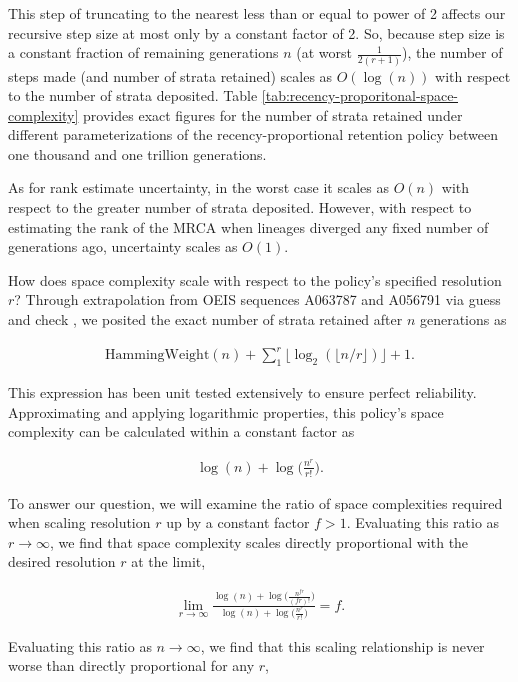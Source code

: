 This step of truncating to the nearest less than or equal to power of 2 affects our recursive step size at most only by a constant factor of 2.
So, because step size is a constant fraction of remaining generations $n$ (at worst $\frac{1}{2(r+1)}$), the number of steps made (and number of strata retained) scales as $O(\log(n))$ with respect to the number of strata deposited.
Table \ref{tab:recency-proporitonal-space-complexity} provides exact figures for the number of strata retained under different parameterizations of the recency-proportional retention policy between one thousand and one trillion generations.

As for rank estimate uncertainty, in the worst case it scales as $O(n)$ with respect to the greater number of strata deposited.
However, with respect to estimating the rank of the MRCA when lineages diverged any fixed number of generations ago, uncertainty scales as $O(1)$.

How does space complexity scale with respect to the policy's specified resolution $r$?
Through extrapolation from OEIS sequences A063787 and A056791 via guess and check \citep{sloane2021a063787,sloane2021a056791}, we posited the exact number of strata retained after $n$ generations as

\begin{align*}
  \mathrm{HammingWeight}(n)
  + \sum_1^r \lfloor \log_2( \lfloor n / r \rfloor ) \rfloor
  + 1.
\end{align*}

This expression has been unit tested extensively to ensure perfect reliability.
Approximating and applying logarithmic properties, this policy's space complexity can be calculated within a constant factor as

\begin{align*}
\log(n) + \log\Big(\frac{n^r}{r!}\Big).
\end{align*}

To answer our question, we will examine the ratio of space complexities required when scaling resolution $r$ up by a constant factor $f > 1$.
Evaluating this ratio as $r \to \infty$, we find that space complexity scales directly proportional with the desired resolution $r$ at the limit,

\begin{align*}
\lim_{r \to \infty}
\frac{
  \log(n) + \log\Big(\frac{n^{fr}}{(fr)!}\Big)
}{
  \log(n) + \log\Big(\frac{n^r}{r!}\Big)
}
= f.
\end{align*}

Evaluating this ratio as $n \to \infty$, we find that this scaling relationship is never worse than directly proportional for any $r$,

